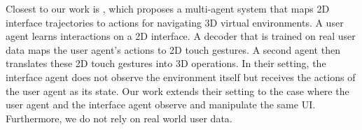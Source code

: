 Closest to our work is \cite{debard2020multiagent}, which proposes a multi-agent system that maps 2D interface trajectories to actions for navigating 3D virtual environments. A user agent learns interactions on a 2D interface. A decoder that is trained on real user data maps the user agent's actions to 2D touch gestures. A second agent then translates these 2D touch gestures into 3D operations. 
In their setting, the interface agent does not observe the environment itself but receives the actions of the user agent as its state.
Our work extends their setting to the case where the user agent and the interface agent observe and manipulate the same UI. Furthermore, we do not rely on real world user data.
